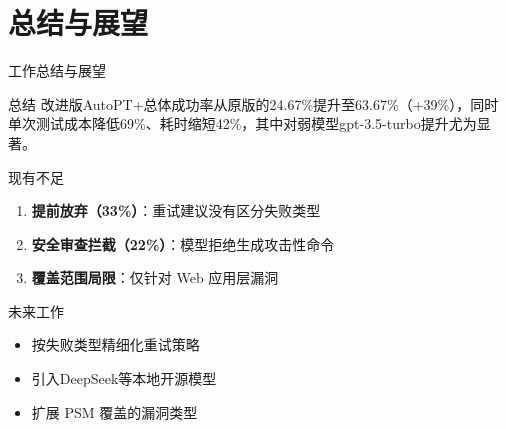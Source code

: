 \section{总结与展望}

\begin{frame}{工作总结与展望}
    \scriptsize
    \begin{block}{总结}
            \vspace{0.5em}
            改进版AutoPT+总体成功率从原版的24.67\%提升至63.67\%（+39\%），同时单次测试成本降低69\%、耗时缩短42\%，其中对弱模型gpt-3.5-turbo提升尤为显著。
        \end{block}   
        \begin{alertblock}{现有不足}
            \begin{enumerate}
                \item \textbf{提前放弃（33\%）}：重试建议没有区分失败类型
                \item \textbf{安全审查拦截（22\%）}：模型拒绝生成攻击性命令
                \item \textbf{覆盖范围局限}：仅针对 Web 应用层漏洞
            \end{enumerate}
        \end{alertblock}
        \begin{block}{未来工作}
            \begin{itemize}
                \item 按失败类型精细化重试策略
                \item 引入DeepSeek等本地开源模型
                \item 扩展 PSM 覆盖的漏洞类型
            \end{itemize}
        \end{block}
\end{frame}
